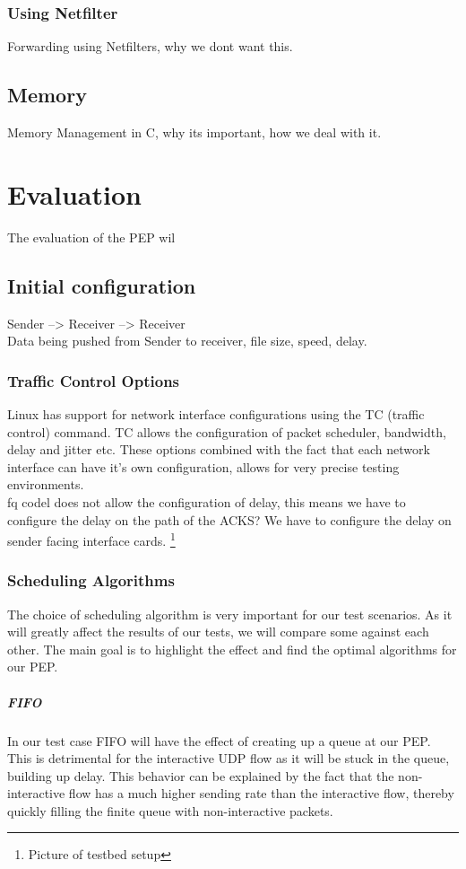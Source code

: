 \documentclass[a4paper,english, 11pt]{report}
\begin{document}
\subsection{Using Netfilter}
Forwarding using Netfilters, why we dont want this.


\section{Memory}
Memory Management in C, why its important, how we deal with it.

\chapter{Evaluation}
The evaluation of the PEP wil
\section{Initial configuration}

Sender --> Receiver --> Receiver
\\
Data being pushed from Sender to receiver, file size, speed, delay.
\subsection{Traffic Control Options}
Linux has support for network interface configurations using the TC (traffic control) command. TC allows the configuration of packet scheduler, bandwidth, delay and jitter etc. These options combined with the fact that each network interface can have it's own configuration, allows for very precise testing environments. 
\\
fq codel does not allow the configuration of delay, this means we have to configure the delay on the path of the ACKS?
We have to configure the delay on sender facing interface cards. 
\footnote{Picture of testbed setup} 

\subsection{Scheduling Algorithms}
The choice of scheduling algorithm is very important for our test scenarios. As it will greatly affect the results of our tests, we will compare some against each other. The main goal is to highlight the effect and find the optimal algorithms for our PEP.

\paragraph{FIFO}
In our test case FIFO will have the effect of creating up a queue at our PEP. This is detrimental for the interactive UDP flow as it will be stuck in the queue, building up delay. This behavior can be explained by the fact that the non-interactive flow has a much higher sending rate than the interactive flow, thereby quickly filling the finite queue with non-interactive packets.
\end{document}
